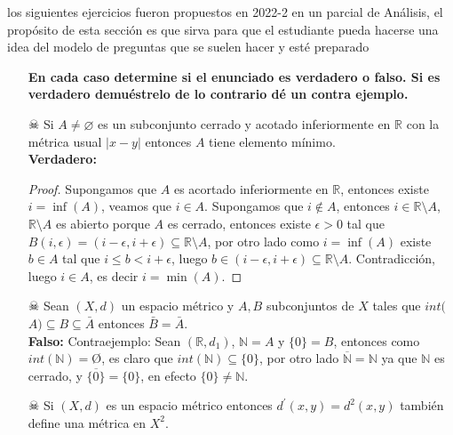 \begin{note}
 los siguientes ejercicios fueron propuestos en 2022-2 en un parcial de Análisis, el propósito de esta sección es que sirva para que el estudiante pueda hacerse una idea del modelo de preguntas que se suelen hacer y esté preparado
\end{note}


\begin{itemize}[leftmargin=*]

\item[]\textbf{En cada caso determine si el enunciado es verdadero o falso. Si es verdadero demuéstrelo de lo contrario dé un contra ejemplo.}

    \item[☠]Si $A \neq \varnothing$ es un subconjunto cerrado y acotado inferiormente en $\mathbb{R}$ con la métrica usual $|x-y|$ entonces $A$ tiene elemento mínimo.\\
    
    \textbf{Verdadero:}\\
    
    \begin{proof}
        Supongamos que $A$ es acortado inferiormente en $\mathbb{R}$, entonces existe $i=\inf(A)$, veamos que $i\in A$. Supongamos que $i \not \in A$, entonces $i \in \mathbb{R}\setminus A$, $\mathbb{R}\setminus A$ es abierto porque $A$ es cerrado, entonces existe $\epsilon>0$ tal que $B(i,\epsilon)=(i-\epsilon,i+\epsilon)\subseteq \mathbb{R}\setminus A$, por otro lado como $i=\inf(A)$ existe $b\in A$ tal que $i\leq b< i+\epsilon$, luego $b\in (i-\epsilon,i+\epsilon)\subseteq \mathbb{R}\setminus A$. Contradicción, luego $i \in A$, es decir $i=\min(A)$.
        
    \end{proof}
    
    \item[☠]Sean $(X, d)$ un espacio métrico y $A, B$ subconjuntos de $X$ tales que $int($$A) \subseteq B \subseteq \bar{A}$ entonces $\bar{B}=\bar{A}$.\\
    
    \textbf{Falso: }Contraejemplo: Sean $(\mathbb{R},d_1)$, $\mathbb{N}=A$ y $\{0\}=B$, entonces como $int(\mathbb{N})=$\O, es claro que $int(\mathbb{N})\subseteq\{0\}$, por otro lado $\overline{\mathbb{N}}=\mathbb{N}$ ya que $\mathbb{N}$ es cerrado, y $\overline{\{0\}}=\{0\}$, en efecto $\{0\}\neq \mathbb{N}$.
    
    \item[☠]Si $(X, d)$ es un espacio métrico entonces $d^{\prime}(x, y)=d^2(x, y)$ también define una métrica en $X^2$.
    

\end{itemize}
